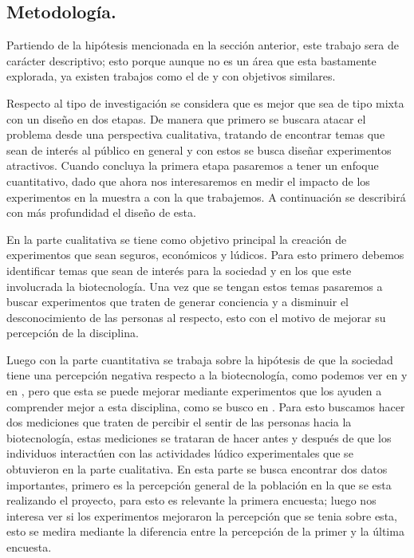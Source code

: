 \documentclass[12pt]{article}
\begin{document}
	\subsection {Metodología.}
		\par Partiendo de la hipótesis mencionada en la sección anterior, este trabajo sera de carácter descriptivo; esto porque aunque no es un área que esta bastamente explorada, ya existen trabajos como el de \cite{kits} y \cite{kits2} con objetivos similares.
		\par Respecto al tipo de investigación se considera que es mejor que sea de tipo mixta con un diseño en dos etapas. De manera que primero se buscara atacar el problema desde una perspectiva cualitativa, tratando de encontrar temas que sean de interés al público en general y con estos se busca diseñar experimentos atractivos. Cuando concluya la primera etapa pasaremos a tener un enfoque cuantitativo, dado que ahora nos interesaremos en medir el impacto de los experimentos en la muestra a con la que trabajemos. A continuación se describirá con más profundidad el diseño de esta.
		
		\par En la parte cualitativa se tiene como objetivo principal la creación de experimentos que sean seguros, económicos y lúdicos. Para esto primero debemos identificar temas que sean de interés para la sociedad y en los que este involucrada la biotecnología. Una vez que se tengan estos temas pasaremos a buscar experimentos que traten de generar conciencia y a disminuir el desconocimiento de las personas al respecto, esto con el motivo de mejorar su percepción de la disciplina.
		\par Luego con la parte cuantitativa se trabaja sobre la hipótesis de que la sociedad tiene una percepción negativa respecto a la biotecnología, como podemos ver en \cite{biot mexico} y en \cite{bio en espania}, pero que esta se puede mejorar mediante experimentos que los ayuden a comprender mejor a esta disciplina, como se busco en \cite{arqueo}. Para esto buscamos hacer dos mediciones que traten de percibir el sentir de las personas hacia la biotecnología, estas mediciones se trataran de hacer antes y después de que los individuos interactúen con las actividades lúdico experimentales que se obtuvieron en la parte cualitativa. En esta parte se busca encontrar dos datos importantes, primero es la percepción general de la población en la que se esta realizando el proyecto, para esto es relevante la primera encuesta; luego nos interesa ver si los experimentos mejoraron la percepción que se tenia sobre esta, esto se medira mediante la diferencia entre la percepción de la primer y la última encuesta.
\end{document}
